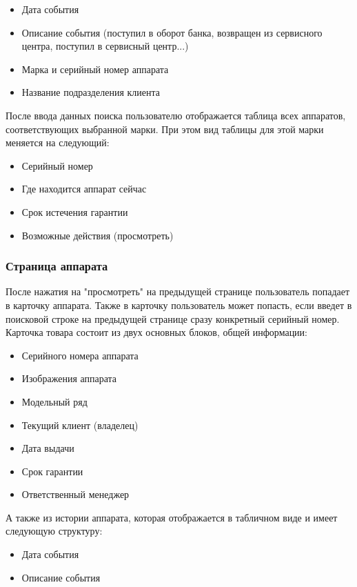 \documentclass[DIV=calc, paper=a4, fontsize=11pt]{scrartcl} %
\begin{document}
\begin{itemize}
	\item Дата события
	\item Описание события (поступил в оборот банка, возвращен из сервисного центра, поступил в сервисный центр...)
	\item Марка и серийный номер аппарата
	\item Название подразделения клиента
\end{itemize}

После ввода данных поиска пользователю отображается таблица всех аппаратов, соответствующих выбранной марки. При этом вид таблицы для этой марки меняется на следующий:

\begin{itemize}
	\item Серийный номер
	\item Где находится аппарат сейчас
	\item Срок истечения гарантии
	\item Возможные действия (просмотреть)
\end{itemize}

\subsubsection{Страница аппарата}
После нажатия на "просмотреть" на предыдущей странице пользователь попадает в карточку аппарата. Также в карточку пользователь может попасть, если введет в поисковой строке на предыдущей странице сразу конкретный серийный номер.
\\[0.5cm]
Карточка товара состоит из двух основных блоков, общей информации:

\begin{itemize}
	\item Серийного номера аппарата
	\item Изображения аппарата
	\item Модельный ряд
	\item Текущий клиент (владелец)
	\item Дата выдачи
	\item Срок гарантии
	\item Ответственный менеджер
\end{itemize}

А также из истории аппарата, которая отображается в табличном виде и имеет следующую структуру:

\begin{itemize}
	\item Дата события
	\item Описание события
\end{itemize}
\end{document}
